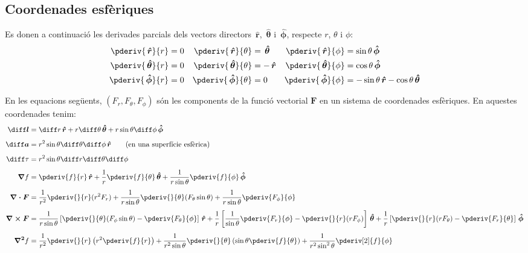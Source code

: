 \documentclass[catalan,a4paper,twoside,11pt]{article}
\begin{document}
\subsection{Coordenades esfèriques}

\renewcommand{\va}{\ensuremath{\,\boldsymbol{\hat{r}}}}
\renewcommand{\vb}{\ensuremath{\,\boldsymbol{\hat{\theta}}}}
\renewcommand{\vc}{\ensuremath{\,\boldsymbol{\hat{\phi}}}}

Es donen a continuació les derivades parcials dels vectors directors $\va$, $\vb$ i $\vc$, respecte  $r$, $\theta$ i $\phi$:
\begin{subequations}
\begin{align}
   \pderiv{\va}{r} &= 0 & \pderiv{\va}{\theta} &= \vb  & \pderiv{\va}{\phi} &= \sin\theta\vc \\
   \pderiv{\vb}{r} &= 0 & \pderiv{\vb}{\theta} &= -\va & \pderiv{\vb}{\phi} &= \cos\theta\vc \\
   \pderiv{\vc}{r} &= 0 & \pderiv{\vc}{\theta} &= 0    & \pderiv{\vc}{\phi} &= -\sin\theta\va-\cos\theta\vb
\end{align}
\end{subequations}

En les equacions següents, $(F_r,F_\theta,F_\phi)$  són
les components de la funció  vectorial  $\boldsymbol{F}$ en un sistema de
coordenades esfèriques. En aquestes coordenades tenim:
\begin{align}
    \boldsymbol{\diff l} &= \diff r \va + r\diff\theta \vb + r \sin\theta\diff \phi \vc\\[1ex]
    \boldsymbol{\diff a} &= r^2 \sin\theta \diff \theta \diff \phi \va\qquad\text{(en una superfície esfèrica)}\\[1ex]
    \diff\tau &= r^2 \sin\theta\diff r \diff \theta \diff \phi\\[1ex]
    \boldsymbol{\nabla}f &= \pderiv{f}{r}\va + \frac{1}{r}\pderiv{f}{\theta}\vb
    + \frac{1}{r\sin\theta}\pderiv{f}{\phi}\vc\\[1ex]
    \boldsymbol{\nabla\cdot F} &= \frac{1}{r^2}\pderiv{}{r}(r^2 F_r) +
    \frac{1}{r\sin\theta}\pderiv{}{\theta}(F_\theta\sin\theta)+
    \frac{1}{r\sin\theta}\pderiv{F_\phi}{\phi}\\[1ex]
    \boldsymbol{\nabla\times F} &= \frac{1}{r\sin\theta}\left[\pderiv{}{\theta}
    (F_\phi\sin\theta)-\pderiv{F_\theta}{\phi}\right]\va +
    \frac{1}{r}\left[\frac{1}{\sin\theta}\pderiv{F_r}{\phi}-
    \pderiv{}{r}(r F_\phi)\right]\vb +\frac{1}{r}\left[\pderiv{}{r}(r F_\theta)-\pderiv{F_r}{\theta}\right]\vc\\[1ex]
    \boldsymbol{\nabla^2}f &= \frac{1}{r^2}\pderiv{}{r}\left(r^2\pderiv{f}{r}
    \right) + \frac{1}{r^2\sin\theta}\pderiv{}{\theta}\left(\sin\theta\pderiv{f}{\theta}\right) +
    \frac{1}{r^2\sin^2\theta}\pderiv[2]{f}{\phi}
\end{align}
\end{document}
